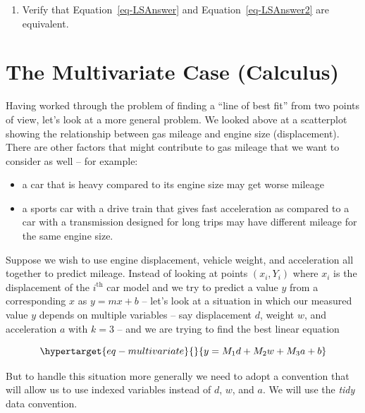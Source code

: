 \documentclass[
  11pt,
  letterpaper,
]{scrbook}
\providecommand{\tightlist}{%
  \setlength{\itemsep}{0pt}\setlength{\parskip}{0pt}}\usepackage{longtable,booktabs,array}
\theoremstyle{plain}
\theoremstyle{remark}
\begin{document}
\begin{enumerate}
\def\labelenumi{\arabic{enumi}.}
\tightlist
\item
  Verify that Equation~\ref{eq-LSAnswer} and Equation~\ref{eq-LSAnswer2}
  are equivalent.
\end{enumerate}

\hypertarget{sec-Multivariate-calculus}{%
\section{The Multivariate Case
(Calculus)}\label{sec-Multivariate-calculus}}

Having worked through the problem of finding a ``line of best fit'' from
two points of view, let's look at a more general problem. We looked
above at a scatterplot showing the relationship between gas mileage and
engine size (displacement). There are other factors that might
contribute to gas mileage that we want to consider as well -- for
example:

\begin{itemize}
\tightlist
\item
  a car that is heavy compared to its engine size may get worse mileage
\item
  a sports car with a drive train that gives fast acceleration as
  compared to a car with a transmission designed for long trips may have
  different mileage for the same engine size.
\end{itemize}

Suppose we wish to use engine displacement, vehicle weight, and
acceleration all together to predict mileage. Instead of looking at
points \((x_i,Y_i)\) where \(x_i\) is the displacement of the
\(i^{\text{th}}\) car model and we try to predict a value \(y\) from a
corresponding \(x\) as \(y=mx+b\) -- let's look at a situation in which
our measured value \(y\) depends on multiple variables -- say
displacement \(d\), weight \(w\), and acceleration \(a\) with \(k=3\) --
and we are trying to find the best linear equation

\begin{equation}\protect\hypertarget{eq-multivariate}{}{
y=M_1 d + M_2 w + M_3 a +b
}\label{eq-multivariate}\end{equation}

But to handle this situation more generally we need to adopt a
convention that will allow us to use indexed variables instead of \(d\),
\(w\), and \(a\). We will use the \emph{tidy} data convention.
\end{document}
